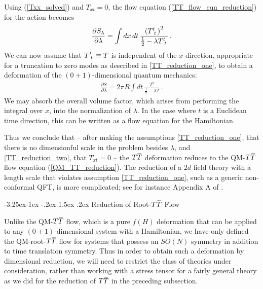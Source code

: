 \documentclass[12pt]{article}
\makeatletter
\numberwithin{equation}{section}
\renewcommand\subsection{\@startsection{subsection}{2}{\z@}%
                                     {-3.25ex\@plus -1ex \@minus -.2ex}%
                                     {1.5ex \@plus .2ex}%
                                     {\normalfont\bfseries}}
\newcommand{\overbar}[1]{\mkern 1.5mu\overline{\mkern-1.5mu#1\mkern-1.5mu}\mkern 1.5mu}
\def\TT{{T\overbar{T}}}
\makeatother
\begin{document}
Using (\ref{Txx_solved}) and $T_{xt} = 0$, the flow equation (\ref{TT_flow_eqn_reduction}) for the action becomes
%
\begin{align}
    \frac{\partial S_\lambda}{\partial \lambda} = \int dx \, dt \, \frac{ \left( \tensor{T}{^t_t} \right)^2 }{ \frac{1}{2} - \lambda \tensor{T}{^t_t}} \, .
\end{align}
%
We can now assume that $\tensor{T}{^t_t} \equiv T$ is independent of the $x$ direction, appropriate for a truncation to zero modes as described in \ref{TT_reduction_one}, to obtain a deformation of the $(0+1)$-dimensional quantum mechanics:
%
\begin{align}\label{QM_TT_reduction}
    \frac{\partial S}{\partial \lambda} = 2 \pi R \int dt \, \frac{T^2}{\frac{1}{2} - \lambda T} \, .
\end{align}
%
We may absorb the overall volume factor, which arises from performing the integral over $x$, into the normalization of $\lambda$. In the case where $t$ is a Euclidean time direction, this can be written as a flow equation for the Hamiltonian.

Thus we conclude that -- after making the assumptions \ref{TT_reduction_one}, that there is no dimensionful scale in the problem besides $\lambda$, and \ref{TT_reduction_two}, that $T_{xt} = 0$ -- the $\TT$ deformation reduces to the QM-$\TT$ flow equation (\ref{QM_TT_reduction}). The reduction of a $2d$ field theory with a length scale that violates assumption \ref{TT_reduction_one}, such as a generic non-conformal QFT, is more complicated; see for instance Appendix A of \cite{Ebert:2022xfh}.

\subsection{Reduction of Root-$\TT$ Flow}

Unlike the QM-$\TT$ flow, which is a pure $f(H)$ deformation that can be applied to any $(0+1)$-dimensional system with a Hamiltonian, we have only defined the QM-root-$\TT$ flow for systems that possess an $SO(N)$ symmetry in addition to time translation symmetry. Thus in order to obtain such a deformation by dimensional reduction, we will need to restrict the class of theories under consideration, rather than working with a stress tensor for a fairly general theory as we did for the reduction of $\TT$ in the preceding subsection.
\end{document}

